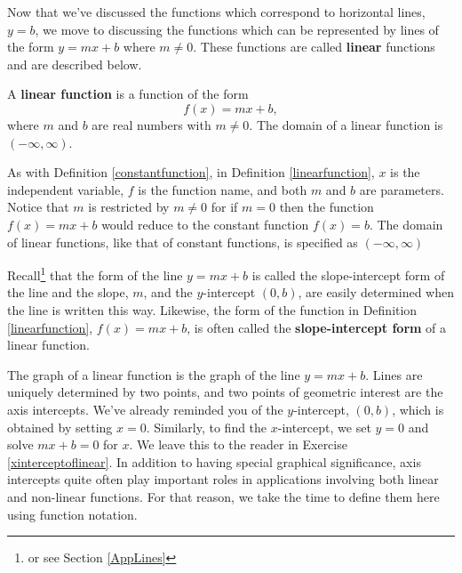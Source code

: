 \documentclass{ximera}
\begin{document}
	\author{Stitz-Zeager}
\begin{abstract}
\end{abstract}
\label{LinearFunctions}

Now that we've discussed the functions which correspond to horizontal lines, $y = b$, we move to discussing the functions which can be represented by lines of the form $y = mx + b$ where $m \neq 0$.  These functions are called \textbf{linear} functions and are described below.

\begin{definition}\label{linearfunction} A \textbf{linear function} is a function of the form \[ f(x) = mx + b,\] where $m$ and $b$ are real numbers with $m \neq 0$.  The domain of a linear function is $(-\infty, \infty)$.
\end{definition}







As with Definition \ref{constantfunction},  in Definition \ref{linearfunction}, $x$ is the independent variable, $f$ is the function name, and both $m$ and $b$ are parameters.  Notice that $m$ is restricted by $m \neq 0$ for if $m = 0$ then the function $f(x) = mx + b$ would reduce to the constant function $f(x) = b$.  The domain of linear functions, like that of constant functions,  is specified as $(-\infty, \infty)$



Recall\footnote{or see Section \ref{AppLines}} that the form of the line $y = mx + b$ is called the slope-intercept form of the line and the slope,  $m$, and the $y$-intercept $(0, b)$, are easily determined when the line is written this way. Likewise, the form of the function in Definition \ref{linearfunction}, $f(x) = mx + b$, is often called the  \textbf{slope-intercept form} of a linear function.



The graph of a linear function is the graph of the line  $y = mx + b$.   Lines are uniquely determined by two points, and two points of geometric interest are the axis intercepts.  We've already reminded you of the $y$-intercept, $(0,b)$, which is obtained by setting $x = 0$. Similarly, to find the $x$-intercept, we set $y = 0$ and solve $mx + b = 0$ for $x$.  We leave this to the reader in Exercise \ref{xinterceptoflinear}.  In addition to having special graphical significance, axis intercepts quite often play important roles in applications involving both linear and non-linear functions.   For that reason, we take the time to define them here using function notation.
\end{document}
